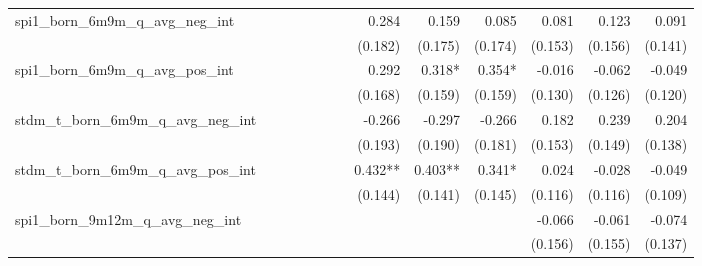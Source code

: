 \begin{tabular}{lrrrrrrrrrrrr}
spi1\_born\_6m9m\_q\_avg\_neg\_int          &              &              &              &              &              &              &        0.284 &        0.159 &        0.085 &        0.081 &        0.123 &        0.091 \\ 
                                            &              &              &              &              &              &              &      (0.182) &      (0.175) &      (0.174) &      (0.153) &      (0.156) &      (0.141) \\ 
spi1\_born\_6m9m\_q\_avg\_pos\_int          &              &              &              &              &              &              &        0.292 &       0.318* &       0.354* &       -0.016 &       -0.062 &       -0.049 \\ 
                                            &              &              &              &              &              &              &      (0.168) &      (0.159) &      (0.159) &      (0.130) &      (0.126) &      (0.120) \\ 
stdm\_t\_born\_6m9m\_q\_avg\_neg\_int       &              &              &              &              &              &              &       -0.266 &       -0.297 &       -0.266 &        0.182 &        0.239 &        0.204 \\ 
                                            &              &              &              &              &              &              &      (0.193) &      (0.190) &      (0.181) &      (0.153) &      (0.149) &      (0.138) \\ 
stdm\_t\_born\_6m9m\_q\_avg\_pos\_int       &              &              &              &              &              &              &      0.432** &      0.403** &       0.341* &        0.024 &       -0.028 &       -0.049 \\ 
                                            &              &              &              &              &              &              &      (0.144) &      (0.141) &      (0.145) &      (0.116) &      (0.116) &      (0.109) \\ 
spi1\_born\_9m12m\_q\_avg\_neg\_int         &              &              &              &              &              &              &              &              &              &       -0.066 &       -0.061 &       -0.074 \\ 
                                            &              &              &              &              &              &              &              &              &              &      (0.156) &      (0.155) &      (0.137) \\ 

\end{tabular}
